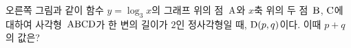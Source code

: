 \noindent\begin{minipage}[t]{0.58\linewidth}\vspace{0pt}\raggedright 오른쪽 그림과 같이 함수 $y=\log_3 x$의 그래프 위의 점~$\mathrm{A}$와 $x$축 위의 두 점~$\mathrm{B}$, $\mathrm{C}$에 대하여 사각형~$\mathrm{ABCD}$가 한 변의 길이가 $2$인 정사각형일 때, $\mathrm{D}(p{,}\mkern3mu\mathopen{}q)$이다. 이때 $p+q$의 값은?\end{minipage}\hfill\begin{minipage}[t]{0.4\linewidth}\vspace{0pt}\centering \resizebox{\ifdim\width>\linewidth\linewidth\else\width\fi}{!}{}\end{minipage}\par
{}
